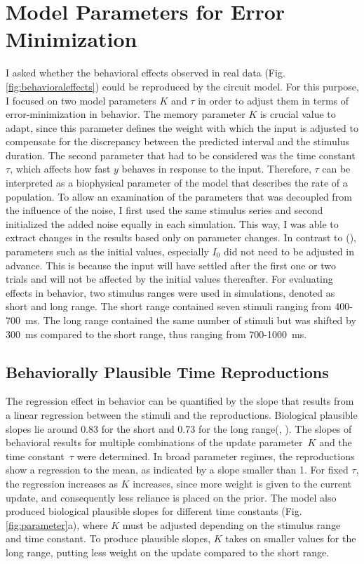 \documentclass[10pt]{article}
\begin{document}
\section{Model Parameters for Error Minimization}
 I asked whether the behavioral effects observed in real data (Fig. \ref{fig:behavioraleffects}) could be reproduced by the circuit model.
For this purpose, I focused on two model parameters $K$ and $\tau$ in order to adjust them in terms of error-minimization in behavior. 
The memory parameter $K$ is crucial value to adapt, since this parameter defines the weight with which the input is adjusted to compensate for the discrepancy between the predicted interval and the stimulus duration.
The second parameter that had to be considered was the time constant $\tau$, which affects how fast $y$ behaves in response to the input. Therefore, $\tau$ can be interpreted as a biophysical parameter of the model that describes the rate of a population.
To allow an examination of the parameters that was decoupled from the influence of the noise, I first used the same stimulus series and second initialized the added noise equally in each simulation. This way, I was able to extract changes in the results based only on parameter changes.
In contrast to \citeauthor{Egger2020} (\citeyear{Egger2020}), parameters such as the initial values, especially $I_0$ did not need to be adjusted in advance. This is because the input will have settled after the first one or two trials and will not be affected by the initial values thereafter.
For evaluating effects in behavior, two stimulus ranges were used in simulations, denoted as short and long range. 
The short range contained seven stimuli ranging from 400-700~ms. 
The long range contained the same number of stimuli but was shifted by 300~ms compared to the short range, thus ranging from 700-1000~ms.
 
\subsection{Behaviorally Plausible Time Reproductions}
The regression effect in behavior can be quantified by the slope that results from a linear regression between the stimuli and the reproductions.
Biological plausible slopes lie around 0.83 for the short and 0.73 for the long range(\cite{Sohn2019}, \cite{Henke2021}). 
The slopes of behavioral results for multiple combinations of the update parameter~$K$ and the time constant~$\tau$ were determined. 
In broad parameter regimes, the reproductions show a regression to the mean, as indicated by a slope smaller than 1. 
For fixed $\tau$, the regression increases as $K$ increases, since more weight is given to the current update, and consequently less reliance is placed on the prior. 
The model also produced biological plausible slopes for different time constants (Fig. \ref{fig:parameter}a), where $K$ must be adjusted depending on the stimulus range and time constant. 
To produce plausible slopes, $K$ takes on smaller values for the long range, putting less weight on the update compared to the short range.
\end{document}
